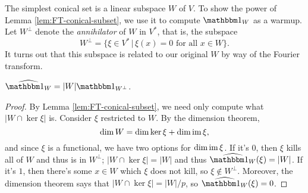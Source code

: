 The simplest conical set is a linear subspace $W$ of $V$.
To show the power of Lemma \ref{lem:FT-conical-subset}, we use it to compute $\IND_W$
as a warmup. Let $W^\perp$ denote the \emph{annihilator} of $W$ in $V^*$, that is, the
subspace
\[ W^\perp = \{ \xi \in V^* \,|\, \xi(x) = 0 \text{ for all } x \in W \}. \]
It turns out that this subspace is related to our original $W$ by way of the Fourier
transform.

\begin{thm}\label{thm:FT-subspace}
    $\widehat{\IND_W} = |W| \IND_{W^\perp}$.
    \begin{proof}
        By Lemma \ref{lem:FT-conical-subset}, we need only compute what 
        $|W\cap\ker\xi|$ is. Consider $\xi$ restricted to $W$. By the dimension theorem,
        \[ \dim W = \dim \ker \xi + \dim \operatorname{im} \xi, \]
        and since $\xi$ is a functional, we have two options for $\dim\operatorname{im}\xi$.
        If it's $0$, then $\xi$ kills all of $W$ and thus is in $W^\perp$; 
        $|W\cap\ker\xi| = |W|$ and thus $\widehat{\IND_W}(\xi) = |W|$. If it's $1$,
        then there's some $x\in W$ which $\xi$ does not kill, so $\xi\not\in W^\perp$.
        Moreover, the dimension theorem says that $|W\cap\ker\xi| = |W|/p$, so 
        $\widehat{\IND_W}(\xi) = 0$.
    \end{proof}
\end{thm}
